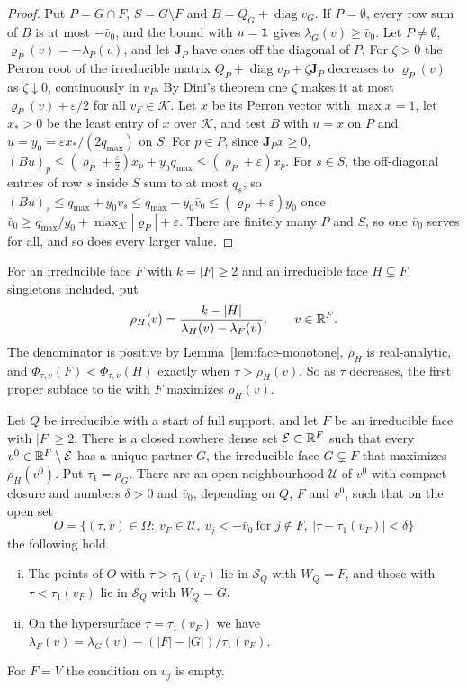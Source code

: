 \begin{proof}
Put $P=G\cap F$, $S=G\setminus F$ and $B=Q_G+\operatorname{diag}v_G$. If $P=\emptyset$, every row
sum of $B$ is at most $-\bar v_0$, and the bound with $u=\mathbf{1}$ gives $\lambda_G(v)\ge\bar v_0$.
Let $P\ne\emptyset$, $\varrho_P(v)=-\lambda_P(v)$, and let $\mathbf J_P$ have ones off the diagonal
of $P$. For $\zeta>0$ the Perron root of the irreducible matrix
$Q_P+\operatorname{diag}v_P+\zeta\mathbf J_P$ decreases to $\varrho_P(v)$ as $\zeta\downarrow0$,
continuously in $v_P$. By Dini's theorem one $\zeta$ makes it at most $\varrho_P(v)+\varepsilon/2$
for all $v_F\in\mathcal K$. Let $x$ be its Perron vector with $\max x=1$, let $x_*>0$ be the least
entry of $x$ over $\mathcal K$, and test $B$ with $u=x$ on $P$ and $u=y_0=\varepsilon
x_*/(2q_{\max})$ on $S$. For $p\in P$, since $\mathbf J_Px\ge0$,
$(Bu)_p\le(\varrho_P+\frac\varepsilon2)x_p+y_0q_{\max}\le(\varrho_P+\varepsilon)x_p$. For $s\in S$,
the off-diagonal entries of row $s$ inside $S$ sum to at most $q_s$, so
$(Bu)_s\le q_{\max}+y_0v_s\le q_{\max}-y_0\bar v_0\le(\varrho_P+\varepsilon)y_0$ once
$\bar v_0\ge q_{\max}/y_0+\max_{\mathcal K}|\varrho_P|+\varepsilon$. There are finitely
many $P$ and $S$, so one $\bar v_0$ serves for all, and so does every larger value.
\end{proof}

For an irreducible face $F$ with $k=|F|\ge2$ and an irreducible face $H\subsetneq F$,
singletons included, put
\[
 \rho_H(v)=\frac{k-|H|}{\lambda_H(v)-\lambda_F(v)},\qquad v\in\mathbb{R}^F .
\]
The denominator is positive by Lemma~\ref{lem:face-monotone}, $\rho_H$ is real-analytic, and
$\Phi_{\tau,v}(F)<\Phi_{\tau,v}(H)$ exactly when $\tau>\rho_H(v)$. So as $\tau$ decreases, the
first proper subface to tie with $F$ maximizes $\rho_H(v)$.

\begin{lemma}\label{lem:exposure}
Let $Q$ be irreducible with a start of full support, and let $F$ be an irreducible face with
$|F|\ge2$. There is a closed nowhere dense set $\mathcal E\subset\mathbb{R}^F$ such that every
$v^0\in\mathbb{R}^F\setminus\mathcal E$ has a unique partner $G$, the irreducible face $G\subsetneq F$
that maximizes $\rho_H(v^0)$. Put $\tau_1=\rho_G$. There are an open neighbourhood
$\mathcal U$ of $v^0$ with compact closure and numbers $\delta>0$ and $\bar v_0$, depending on
$Q$, $F$ and $v^0$, such that on the open set
\[
 O=\bigl\{(\tau,v)\in\Omega:\ v_F\in\mathcal U,\ v_j<-\bar v_0\ \text{for } j\notin F,\
 |\tau-\tau_1(v_F)|<\delta\bigr\}
\]
the following hold.
\begin{enumerate}[(i)]
\item The points of $O$ with $\tau>\tau_1(v_F)$ lie in $\mathcal S_Q$ with $W_Q=F$, and those
with $\tau<\tau_1(v_F)$ lie in $\mathcal S_Q$ with $W_Q=G$.
\item On the hypersurface $\tau=\tau_1(v_F)$ we have
$\lambda_F(v)=\lambda_G(v)-(|F|-|G|)/\tau_1(v_F)$.
\end{enumerate}
For $F=V$ the condition on $v_j$ is empty.
\end{lemma}

